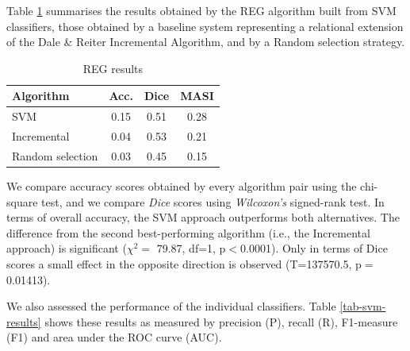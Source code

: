 \documentclass[11pt]{article}
\begin{document}
Table \ref{tab-reg-results} summarises the results obtained by the REG algorithm built from SVM classifiers, those obtained by a baseline system representing a relational extension of the Dale \& Reiter Incremental Algorithm, and by a Random selection strategy.  

\begin{table}[ht]
\begin{center}
\caption{REG results}
\label{tab-reg-results}
\footnotesize{
\begin{tabular} {  l c c c }
\hline
{Algorithm}							& {Acc.} 	& { Dice}		& MASI \\ \hline 
SVM											& 0.15		&	0.51			& 0.28 \\
Incremental							& 0.04		&	0.53			& 0.21 \\
Random selection       	& 0.03    & 0.45      & 0.15 \\
\hline
\end{tabular}
}
\end{center}
\end{table}
\normalsize

We compare accuracy scores obtained by every algorithm pair using the chi-square test, and we compare {\em Dice} scores using {\em Wilcoxon's} signed-rank test. In terms of overall accuracy, the SVM approach outperforms both alternatives. The difference from the second best-performing algorithm (i.e., the Incremental approach) is significant ($\chi^{2}=$ 79.87, df=1, p$<$0.0001). Only in terms of Dice scores a small effect in the opposite direction is observed (T=137570.5, p$=$ 0.01413). 

We also assessed the performance of the individual classifiers. Table \ref{tab-svm-results} shows these results as measured by precision (P), recall (R), F1-measure (F1) and area under the ROC curve (AUC). 
\end{document}
